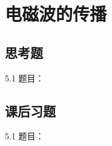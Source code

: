 \chapter{电磁波的传播}

\section{思考题}

\begin{thinking}{5.1}
  题目：\todoanswer

  \begin{solution}
    \todoanswer
  \end{solution}
\end{thinking}

\section{课后习题}

\begin{exercise}{5.1}
  题目：\todoanswer

  \begin{solution}
    \todoanswer
  \end{solution}
\end{exercise}
